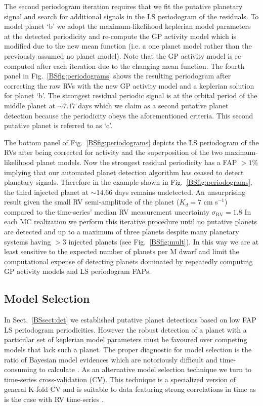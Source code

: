 The second periodogram iteration requires that we fit the putative planetary signal and search for
additional signals in the LS periodogram of the residuals. To model planet `b'
we adopt the maximum-likelihood keplerian model parameters at the detected periodicity
and re-compute the GP activity model which is modified due to the new mean function (i.e. a one planet model
rather than the previously assumed no planet model). Note that the GP activity model is re-computed after each
iteration due to the changing mean function. The fourth panel in Fig.~\ref{BSfig:periodograms} shows
the resulting periodogram after correcting the raw RVs with the new GP activity model and a keplerian solution
for planet `b'. The strongest residual
periodic signal is at the orbital period of the middle planet at $\sim 7.17$ days which
we claim as a second putative planet detection because the periodicity obeys the aforementioned criteria.
This second putative planet is referred to as `c'.

The bottom panel of Fig.~\ref{BSfig:periodograms} depicts the LS periodogram of the RVs after being
corrected for activity and the superposition of the two maximum-likelihood planet models. Now the strongest
residual periodicity has a FAP $>1$\% implying that our automated planet detection algorithm has ceased to
detect planetary signals. Therefore in the example shown in Fig.~\ref{BSfig:periodograms}, the
third injected planet at $\sim 14.66$ days remains undetected. An unsurprising result given the small RV
semi-amplitude of the planet ($K_d=7$ cm s$^{-1}$) compared to the time-series' median RV measurement
uncertainty $\sigma_{\text{RV}}=1.8$  In each MC realization we perform this iterative procedure
until no putative planets are detected and up to
a maximum of three planets despite many planetary systems having $>3$ injected planets
(see Fig.~\ref{BSfig:mult}). In this way we are at least
sensitive to the expected number of planets per M dwarf \citep[$2.5 \pm 0.2$;][]{dressing15a} 
and limit the computational expense of detecting planets dominated by repeatedly computing GP activity
models and LS periodogram FAPs.


\subsection{Model Selection} \label{BSsect:CV}
In Sect.~\ref{BSsect:det} we established putative planet detections based on low FAP LS periodogram
periodicities. However the robust detection of a planet with a particular set of keplerian model parameters
must be favoured over competing models that lack such a planet. The proper diagnostic for model
selection is the ratio of Bayesian model evidences which are
notoriously difficult and time-consuming to calculate \citep{ford07}. 
As an alternative model selection technique we turn to time-series
cross-validation (CV). This technique is a specialized version of general K-fold CV
and is suitable to data featuring strong correlations in time as is the case with RV time-series
\citep{arlot10}.


